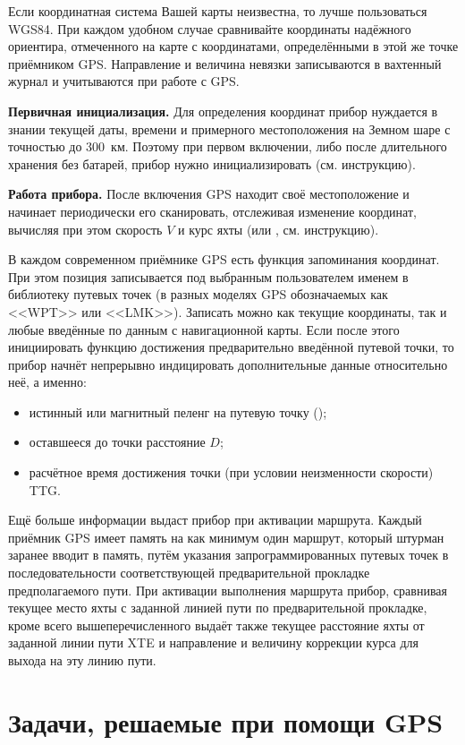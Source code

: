 Если координатная система Вашей карты неизвестна, то лучше
пользоваться WGS84. При каждом удобном случае сравнивайте координаты
надёжного ориентира, отмеченного на карте с координатами,
определёнными в этой же точке приёмником GPS. Направление и величина
невязки записываются в вахтенный журнал и учитываются при работе с
GPS.

\textbf{Первичная инициализация.} Для определения координат прибор
нуждается в знании текущей даты, времени и примерного местоположения
на Земном шаре с точностью до 300~км. Поэтому при первом включении,
либо после длительного хранения без батарей, прибор нужно
инициализировать (см. инструкцию).

\textbf{Работа прибора.} После включения GPS находит своё
местоположение и начинает периодически его сканировать, отслеживая
изменение координат, вычисляя при этом скорость $V$ и курс яхты \IK
(или \MK, см. инструкцию).

В каждом современном приёмнике GPS есть функция запоминания
координат. При этом позиция записывается под выбранным пользователем
именем в библиотеку путевых точек (в разных моделях GPS обозначаемых
как <<WPT>> или <<LMK>>). Записать можно как текущие координаты, так и
любые введённые по данным с навигационной карты. Если после этого
инициировать функцию достижения предварительно введённой путевой
точки, то прибор начнёт непрерывно индицировать дополнительные данные
относительно неё, а именно:

\begin{itemize}
\item истинный или магнитный пеленг на путевую точку \IP (\MP);
\item оставшееся до точки расстояние $D$; 
\item расчётное время достижения точки (при условии неизменности
  скорости) TTG.
\end{itemize} 

Ещё больше информации выдаст прибор при активации маршрута. Каждый
приёмник GPS имеет память на как минимум один маршрут, который штурман
заранее вводит в память, путём указания запрограммированных путевых
точек в последовательности соответствующей предварительной прокладке
предполагаемого пути. При активации выполнения маршрута прибор,
сравнивая текущее место яхты с заданной линией пути по предварительной
прокладке, кроме всего вышеперечисленного выдаёт также текущее
расстояние яхты от заданной линии пути XTE и направление и величину
коррекции курса для выхода на эту линию пути.

\section{Задачи, решаемые при помощи GPS}

